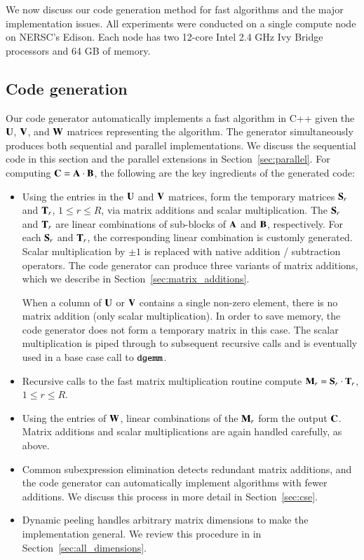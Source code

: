 \documentclass[preprint]{sigplanconf}
\newcommand{\M}[2][]{{\bm{#1\mathbf{\MakeUppercase{#2}}}}}
\begin{document}
We now discuss our code generation method for fast algorithms and the major implementation issues.
All experiments were conducted on a single compute node on NERSC's Edison.
Each node has two 12-core Intel 2.4 GHz Ivy Bridge processors and 64 GB of memory.

\label{sec:implementation}

\subsection{Code generation}
\label{sec:codegen}

Our code generator automatically implements a fast algorithm in C++ given the $\M{U}$, $\M{V}$, and $\M{W}$ matrices representing the algorithm.
The generator simultaneously produces both sequential and parallel implementations.
We discuss the sequential code in this section and the parallel extensions in Section~\ref{sec:parallel}.
For computing $\M{C} = \M{A} \cdot \M{B}$, the following are the key ingredients of the generated code:
\begin{itemize}
\item
Using the entries in the $\M{U}$ and $\M{V}$ matrices, form the temporary matrices $\M{S}_r$ and $\M{T}_r$, $1 \le r \le R$, via matrix additions and scalar multiplication.
The $\M{S}_r$ and $\M{T}_r$ are linear combinations of sub-blocks of $\M{A}$ and $\M{B}$, respectively.
For each $\M{S}_r$ and $\M{T}_r$, the corresponding linear combination is customly generated.
Scalar multiplication by $\pm 1$ is replaced with native addition / subtraction operators.
The code generator can produce three variants of matrix additions, which we describe in Section~\ref{sec:matrix_additions}.

When a column of $\M{U}$ or $\M{V}$ contains a single non-zero element, there is no matrix addition (only scalar multiplication).
In order to save memory, the code generator does not form a temporary matrix in this case.
The scalar multiplication is piped through to subsequent recursive calls and is eventually used in a base case call to $\texttt{dgemm}$.

\item
Recursive calls to the fast matrix multiplication routine compute $\M{M}_r = \M{S}_r \cdot \M{T}_r$, $1 \le r \le R$.


\item
Using the entries of $\M{W}$, linear combinations of the $\M{M}_r$ form the output $\M{C}$.
Matrix additions and scalar multiplications are again handled carefully, as above.

\item
Common subexpression elimination detects redundant matrix additions, and the code generator can automatically implement
algorithms with fewer additions.
We discuss this process in more detail in Section~\ref{sec:cse}.

\item
Dynamic peeling handles arbitrary matrix dimensions to make the implementation general.
We review this procedure in in Section~\ref{sec:all_dimensions}.

\end{itemize}
\end{document}
